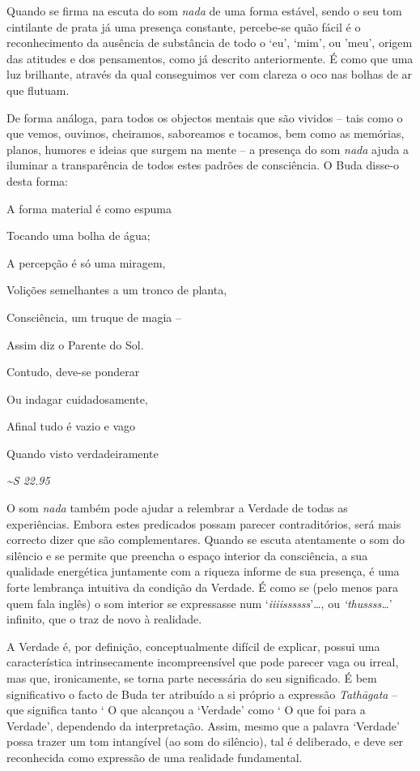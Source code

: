Quando se firma na escuta do som \emph{nada} de uma forma estável, sendo
o seu tom cintilante de prata já uma presença constante, percebe-se quão
fácil é o reconhecimento da ausência de substância de todo o `eu',
`mim', ou 'meu', origem das atitudes e dos pensamentos, como já descrito
anteriormente. É como que uma luz brilhante, através da qual conseguimos
ver com clareza o oco nas bolhas de ar que flutuam.

De forma análoga, para todos os objectos mentais que são vividos -- tais
como o que vemos, ouvimos, cheiramos, saboreamos e tocamos, bem como as
memórias, planos, humores e ideias que surgem na mente -- a presença do
som \emph{nada} ajuda a iluminar a transparência de todos estes padrões
de consciência. O Buda disse-o desta forma:

A forma material é como espuma

Tocando uma bolha de água;

A percepção é só uma miragem,

Volições semelhantes a um tronco de planta,

Consciência, um truque de magia --

Assim diz o Parente do Sol.

Contudo, deve-se ponderar

Ou indagar cuidadosamente,

Afinal tudo é vazio e vago

Quando visto verdadeiramente

\emph{\textasciitilde{}S 22.95}

O som \emph{nada} também pode ajudar a relembrar a Verdade de todas as
experiências. Embora estes predicados possam parecer contraditórios,
será mais correcto dizer que são complementares. Quando se escuta
atentamente o som do silêncio e se permite que preencha o espaço
interior da consciência, a sua qualidade energética juntamente com a
riqueza informe de sua presença, é uma forte lembrança intuitiva da
condição da Verdade. É como se (pelo menos para quem fala inglês) o som
interior se expressasse num `\emph{iiiissssss}'\ldots{}, ou
\emph{`thussss\ldots{}}' infinito, que o traz de novo à realidade.

A Verdade é, por definição, conceptualmente difícil de explicar, possui
uma característica intrinsecamente incompreensível que pode parecer vaga
ou irreal, mas que, ironicamente, se torna parte necessária do seu
significado. É bem significativo o facto de Buda ter atribuído a si
próprio a expressão \emph{Tathāgata} -- que significa tanto ` O que
alcançou a `Verdade' como ` O que foi para a Verdade', dependendo da
interpretação. Assim, mesmo que a palavra `Verdade' possa trazer um tom
intangível (ao som do silêncio), tal é deliberado, e deve ser
reconhecida como expressão de uma realidade fundamental.

